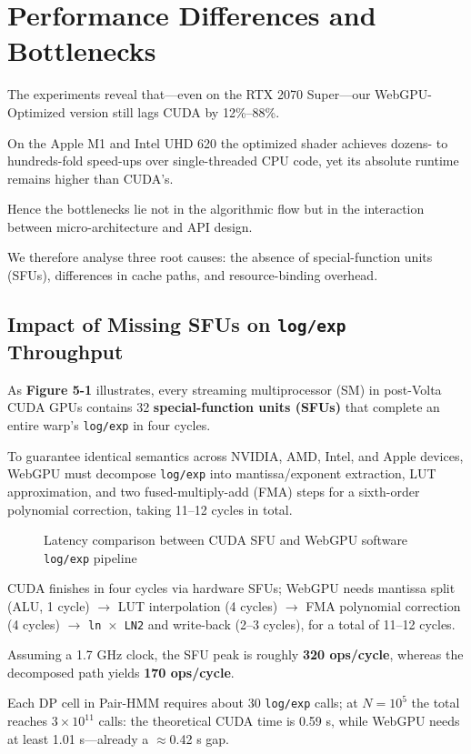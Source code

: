 \documentclass[12pt]{report}
\begin{document}
\section{Performance Differences and Bottlenecks}
The experiments reveal that—even on the RTX 2070 Super—our WebGPU-Optimized version still lags CUDA by 12\%–88\%.

On the Apple M1 and Intel UHD 620 the optimized shader achieves dozens- to hundreds-fold speed-ups over single-threaded CPU code, yet its absolute runtime remains higher than CUDA’s.

Hence the bottlenecks lie not in the algorithmic flow but in the interaction between micro-architecture and API design.

We therefore analyse three root causes: the absence of special-function units (SFUs), differences in cache paths, and resource-binding overhead.

\subsection{Impact of Missing SFUs on \texttt{log/exp} Throughput}
As \textbf{Figure 5-1} illustrates, every streaming multiprocessor (SM) in post-Volta CUDA GPUs contains 32 \textbf{special-function units (SFUs)} that complete an entire warp’s \texttt{log/exp} in four cycles.

To guarantee identical semantics across NVIDIA, AMD, Intel, and Apple devices, WebGPU must decompose \texttt{log/exp} into mantissa/exponent extraction, LUT approximation, and two fused-multiply-add (FMA) steps for a sixth-order polynomial correction, taking 11–12 cycles in total.

\begin{figure}[h]
    \caption{Latency comparison between CUDA SFU and WebGPU software \texttt{log/exp} pipeline}
    \label{fig:log_exp_pipeline}
\end{figure}

CUDA finishes in four cycles via hardware SFUs; WebGPU needs mantissa split (ALU, 1 cycle) $\rightarrow$ LUT interpolation (4 cycles) $\rightarrow$ FMA polynomial correction (4 cycles) $\rightarrow$ \texttt{ln $\times$ LN2} and write-back (2–3 cycles), for a total of 11–12 cycles.

Assuming a 1.7 GHz clock, the SFU peak is roughly \textbf{320 ops/cycle}, whereas the decomposed path yields \textbf{170 ops/cycle}.

Each DP cell in Pair-HMM requires about 30 \texttt{log/exp} calls; at $N=10^5$ the total reaches $3 \times 10^{11}$ calls: the theoretical CUDA time is 0.59 s, while WebGPU needs at least 1.01 s—already a $\approx$0.42 s gap.
\end{document}
